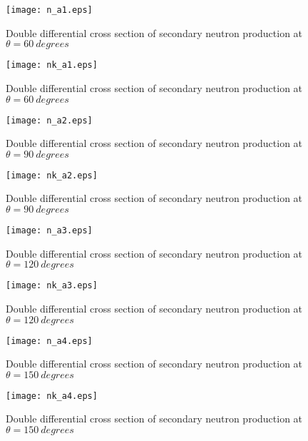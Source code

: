 \documentclass[12pt]{article}
\begin{document}
\begin{figure}[htbp]
\caption{Double differential cross section of secondary neutron production at $\theta = 60~degrees$}
\label{figa1} 
\centerline{\texttt{[image: n\_a1.eps]}}
\end{figure}

\begin{figure}[htbp]
\caption{Double differential cross section of secondary neutron production at $\theta = 60~degrees$}
\label{figa1a} 
\centerline{\texttt{[image: nk\_a1.eps]}}
\end{figure}

\begin{figure}[htbp]
\caption{Double differential cross section of secondary neutron production at $\theta = 90~degrees$}
\label{figa2} 
\centerline{\texttt{[image: n\_a2.eps]}}
\end{figure}

\begin{figure}[htbp]
\caption{Double differential cross section of secondary neutron production at $\theta = 90~degrees$}
\label{figa2a} 
\centerline{\texttt{[image: nk\_a2.eps]}}
\end{figure}

\begin{figure}[htbp]
\caption{Double differential cross section of secondary neutron production at $\theta = 120~degrees$}
\label{figa3} 
\centerline{\texttt{[image: n\_a3.eps]}}
\end{figure}

\begin{figure}[htbp]
\caption{Double differential cross section of secondary neutron production at $\theta = 120~degrees$}
\label{figa3a} 
\centerline{\texttt{[image: nk\_a3.eps]}}
\end{figure}

\begin{figure}[htbp]
\caption{Double differential cross section of secondary neutron production at $\theta = 150~degrees$}
\label{figa4} 
\centerline{\texttt{[image: n\_a4.eps]}}
\end{figure}

\begin{figure}[htbp]
\caption{Double differential cross section of secondary neutron production at $\theta = 150~degrees$}
\label{figa4a} 
\centerline{\texttt{[image: nk\_a4.eps]}}
\end{figure}
\end{document}
